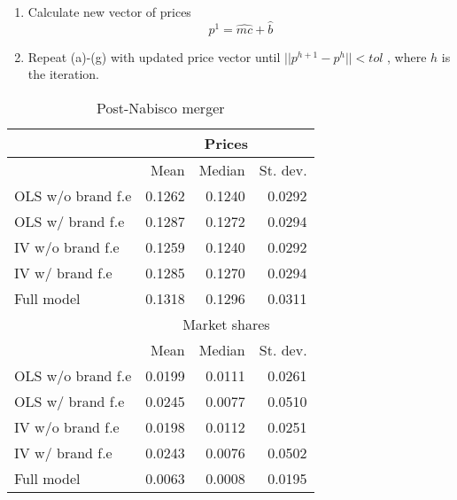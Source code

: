 \documentclass[12pt,english]{article}
\begin{document}
\begin{enumerate}
\begin{enumerate}
\item Calculate new vector of prices 
\[
p^{1}=\hat{mc}+\hat{b}
\]
\item Repeat (a)-(g) with updated price vector until $|| p^{h+1}-p^{h}||<tol$ , where $h$ is the iteration.
\end{enumerate}

\begin{table}[H]
  \centering
  \caption{Post-Nabisco merger}
    \begin{tabular}{lrrr}
    \hline
          & \multicolumn{3}{c}{Prices} \\
    \hline
          & Mean  & Median & St. dev. \\
          \hline
    OLS w/o brand f.e & 0.1262 & 0.1240 & 0.0292 \\
    OLS w/ brand f.e & 0.1287 & 0.1272 & 0.0294 \\
    IV w/o brand f.e & 0.1259 & 0.1240 & 0.0292 \\
    IV w/ brand f.e & 0.1285 & 0.1270 & 0.0294 \\
    Full model & 0.1318 & 0.1296 & 0.0311 \\
    \hline
          & \multicolumn{3}{c}{Market shares} \\
          \hline
          & Mean  & Median & St. dev. \\
          \hline
    OLS w/o brand f.e & 0.0199 & 0.0111 & 0.0261 \\
    OLS w/ brand f.e & 0.0245 & 0.0077 & 0.0510 \\
    IV w/o brand f.e & 0.0198 & 0.0112 & 0.0251 \\
    IV w/ brand f.e & 0.0243 & 0.0076 & 0.0502 \\
    Full model & 0.0063 & 0.0008 & 0.0195 \\
    \hline
    \end{tabular}%
  \label{t4}%
\end{table}



\end{enumerate}
\end{document}
